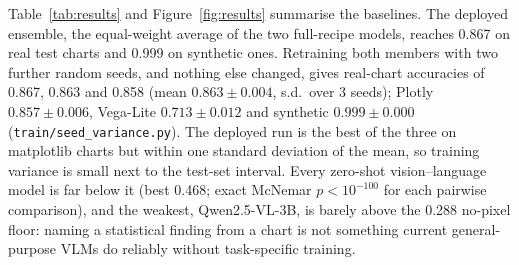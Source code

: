 \documentclass[11pt,a4paper]{article}
\begin{document}
\begin{table}[t]\centering\small
\caption{Accuracy on the 1{,}192 real test charts drawn by three renderers, and on
synthetic test charts. Brackets: 95\% bootstrap CI. $^\dagger$Fixed 400-chart synthetic
sample.}
\label{tab:results}
\end{table}

Table~\ref{tab:results} and Figure~\ref{fig:results} summarise the baselines. The deployed
ensemble, the equal-weight average of the two full-recipe models, reaches 0.867 on real
test charts and 0.999 on synthetic ones. Retraining both members with two further random seeds, and nothing else changed, gives real-chart accuracies of 0.867, 0.863 and 0.858 (mean $0.863 \pm 0.004$, s.d.\ over 3 seeds); Plotly $0.857 \pm 0.006$, Vega-Lite $0.713 \pm 0.012$ and synthetic $0.999 \pm 0.000$ (\texttt{train/seed\_variance.py}). The deployed run is the best of the three on matplotlib charts but within one standard deviation of the mean, so training variance is small next to the test-set interval. Every zero-shot vision--language model is far
below it (best 0.468; exact McNemar $p<10^{-100}$ for each pairwise comparison), and the
weakest, Qwen2.5-VL-3B, is barely above the 0.288 no-pixel floor: naming a statistical
finding from a chart is not something current general-purpose VLMs do reliably without
task-specific training.
\end{document}
